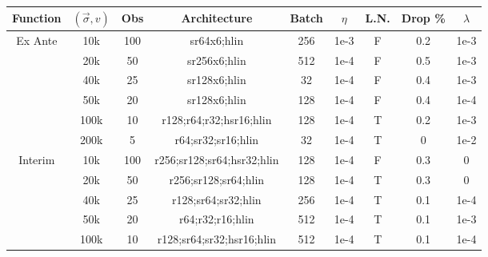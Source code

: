 \begin{table*}[ht]
\centering
\begin{tabular}{c|c|c|c|c|c|c|c|c}
Function                    & $(\vec{\sigma}, v)$   & Obs            & Architecture               & Batch      & $\eta$    & L.N. & Drop \% & $\lambda$     \\ \hline
Ex Ante                     & 10k                   & 100            & sr64x6;hlin                & 256        & 1e-3      & F      & 0.2        & 1e-3              \\
                            & 20k                   & 50             & sr256x6;hlin               & 512        & 1e-4      & F      & 0.5        & 1e-3              \\
                            & 40k                   & 25             & sr128x6;hlin               & 32         & 1e-4      & F      & 0.4        & 1e-3              \\
                            & 50k                   & 20             & sr128x6;hlin               & 128        & 1e-4      & F      & 0.4        & 1e-4             \\
                            & 100k                  & 10             & r128;r64;r32;hsr16;hlin    & 128        & 1e-4      & T       & 0.2        & 1e-3              \\
                            & 200k                  & 5              & r64;sr32;sr16;hlin         & 32         & 1e-4      & T       & 0          & 1e-2               \\ \hline
Interim                  & 10k                   & 100            & r256;sr128;sr64;hsr32;hlin & 128        & 1e-4      & F      & 0.3        & 0                  \\
                            & 20k                   & 50             & r256;sr128;sr64;hlin       & 128        & 1e-4      & T       & 0.3        & 0                  \\
                            & 40k                   & 25             & r128;sr64;sr32;hlin        & 256        & 1e-4      & T       & 0.1        & 1e-4              \\
                            & 50k                   & 20             & r64;r32;r16;hlin           & 512        & 1e-4      & T       & 0.1        & 1e-3               \\
                            & 100k                  & 10             & r128;sr64;sr32;hsr16;hlin  & 512        & 1e-4      & T       & 0.1        & 1e-4              \\

\end{tabular}
\end{table*}
